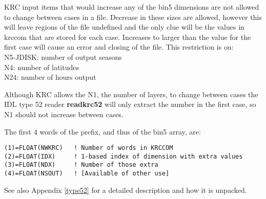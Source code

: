 \documentclass{article}
\newcommand{\qi}{\\ \hspace*{2.em}}      %
\newcommand{\np}{\textbf}  %
\begin{document}
KRC input items that would increase any of the bin5 dimensions are not allowed
to change between cases in a file. Decrease in these sizes are allowed, however
this will leave regions of the file undefined and the only clue will be the
values in krccom that are stored for each case. Increases to larger than the
value for the first case will cause an error and closing of the file. This
restriction is on:
\qi N5-JDISK: number of output seasons
\qi N4: number of latitudes
\qi N24: number of hours output

Although KRC allows the N1, the number of layers, to change between cases the
IDL type 52 reader \np{readkrc52} will only extract the number in the first
case, so N1 should not increase between cases.

The first 4 words of the prefix, and thus of the bin5 array, are:
\vspace{-3.mm} 
\begin{verbatim}
(1)=FLOAT(NWKRC)   ! Number of words in KRCCOM
(2)=FLOAT(IDX)     ! 1-based index of dimension with extra values
(3)=FLOAT(NDX)     ! Number of those extra
(4)=FLOAT(NSOUT)   ! [Available of other use]
\end{verbatim}

See also Appendix \ref{type52} for a detailed description and how it is unpacked.
\end{document}

